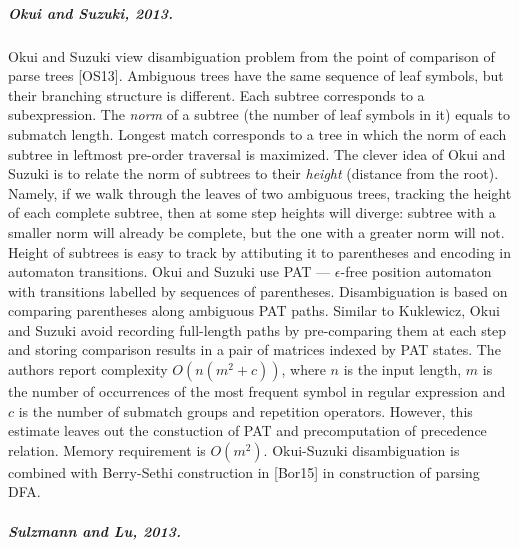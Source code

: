 \documentclass[AMA,STIX1COL]{WileyNJD-v2}
\begin{document}
\subparagraph{Okui and Suzuki, 2013.}

Okui and Suzuki view disambiguation problem from the point of comparison of parse trees [OS13].
Ambiguous trees have the same sequence of leaf symbols, but their branching structure is different.
Each subtree corresponds to a subexpression.
The \emph{norm} of a subtree (the number of leaf symbols in it) equals to submatch length.
Longest match corresponds to a tree in which the norm of each subtree in leftmost pre-order traversal is maximized.
The clever idea of Okui and Suzuki is to relate the norm of subtrees to their \emph{height} (distance from the root).
Namely, if we walk through the leaves of two ambiguous trees, tracking the height of each complete subtree,
then at some step heights will diverge:
subtree with a smaller norm will already be complete, but the one with a greater norm will not.
Height of subtrees is easy to track by attibuting it to parentheses and encoding in automaton transitions.
Okui and Suzuki use PAT --- $\epsilon$-free position automaton with transitions labelled by sequences of parentheses.
Disambiguation is based on comparing parentheses along ambiguous PAT paths.
Similar to Kuklewicz, Okui and Suzuki avoid recording full-length paths
by pre-comparing them at each step and storing comparison results in a pair of matrices indexed by PAT states.
The authors report complexity $O(n(m^2 + c))$, where
$n$ is the input length,
$m$ is the number of occurrences of the most frequent symbol in regular expression
and $c$ is the number of submatch groups and repetition operators.
However, this estimate leaves out the constuction of PAT and precomputation of precedence relation.
Memory requirement is $O(m^2)$.
Okui-Suzuki disambiguation is combined with Berry-Sethi construction in [Bor15] in construction of parsing DFA.

\subparagraph{Sulzmann and Lu, 2013.}
\end{document}
